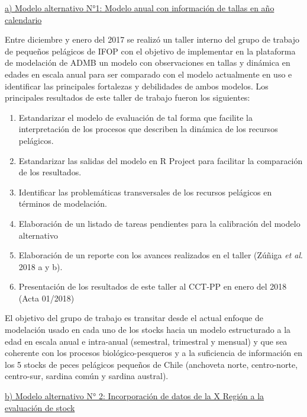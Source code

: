 \documentclass[
  spanish,
]{article}
\providecommand{\tightlist}{%
  \setlength{\itemsep}{0pt}\setlength{\parskip}{0pt}}
\begin{document}
\vspace{0.3cm}

\underline{a) Modelo alternativo N°1: Modelo anual con información de tallas en año calendario}

Entre diciembre y enero del 2017 se realizó un taller interno del grupo
de trabajo de pequeños pelágicos de IFOP con el objetivo de implementar
en la plataforma de modelación de ADMB un modelo con observaciones en
tallas y dinámica en edades en escala anual para ser comparado con el
modelo actualmente en uso e identificar las principales fortalezas y
debilidades de ambos modelos. Los principales resultados de este taller
de trabajo fueron los siguientes:

\begin{enumerate}
\def\labelenumi{\alph{enumi})}
\tightlist
\item
  Estandarizar el modelo de evaluación de tal forma que facilite la
  interpretación de los procesos que describen la dinámica de los
  recursos pelágicos.
\item
  Estandarizar las salidas del modelo en R Project para facilitar la
  comparación de los resultados.
\item
  Identificar las problemáticas transversales de los recursos pelágicos
  en términos de modelación.
\item
  Elaboración de un listado de tareas pendientes para la calibración del
  modelo alternativo
\item
  Elaboración de un reporte con los avances realizados en el taller
  (Zúñiga \emph{et al}. 2018 a y b).
\item
  Presentación de los resultados de este taller al CCT-PP en enero del
  2018 (Acta 01/2018)
\end{enumerate}

El objetivo del grupo de trabajo es transitar desde el actual enfoque de
modelación usado en cada uno de los stocks hacia un modelo estructurado
a la edad en escala anual e intra-anual (semestral, trimestral y
mensual) y que sea coherente con los procesos biológico-pesqueros y a la
suficiencia de información en los 5 stocks de peces pelágicos pequeños
de Chile (anchoveta norte, centro-norte, centro-sur, sardina común y
sardina austral).

\vspace{0.5cm}

\underline{b) Modelo alternativo N° 2: Incorporación de datos de la X Región a la evaluación de stock}
\end{document}
